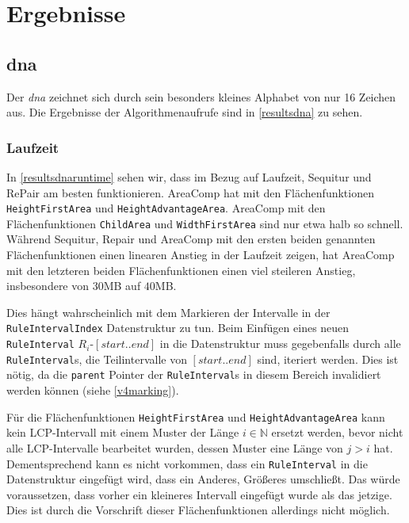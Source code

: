 \section{Ergebnisse}

\subsection{dna}

Der \emph{dna} zeichnet sich durch sein besonders kleines Alphabet von nur 16 Zeichen aus. Die Ergebnisse der Algorithmenaufrufe sind in \autoref{resultsdna} zu sehen. 

\subsubsection{Laufzeit}

In \autoref{resultsdnaruntime} sehen wir, dass im Bezug auf Laufzeit, Sequitur und RePair am besten funktionieren. AreaComp hat mit den Flächenfunktionen \texttt{HeightFirstArea} und \texttt{HeightAdvantageArea}. AreaComp mit den Flächenfunktionen \texttt{ChildArea} und \texttt{WidthFirstArea} sind nur etwa halb so schnell. 
Während Sequitur, Repair und AreaComp mit den ersten beiden genannten Flächenfunktionen einen linearen Anstieg in der Laufzeit zeigen, hat AreaComp mit den letzteren beiden Flächenfunktionen einen viel steileren Anstieg, insbesondere von $30$MB auf $40$MB.

Dies hängt wahrscheinlich mit dem Markieren der Intervalle in der \texttt{RuleIntervalIndex} Datenstruktur zu tun. Beim Einfügen eines neuen \texttt{RuleInterval} $R_i$-$[start..end]$ in die Datenstruktur muss gegebenfalls durch alle \texttt{RuleInterval}s, die Teilintervalle von $[start..end]$ sind, iteriert werden. Dies ist nötig, da die \texttt{parent} Pointer der \texttt{RuleInterval}s in diesem Bereich invalidiert werden können (siehe \autoref{v4marking}).

Für die Flächenfunktionen \texttt{HeightFirstArea} und \texttt{HeightAdvantageArea} kann kein LCP-Intervall mit einem Muster der Länge $i \in \mathbb{N}$ ersetzt werden, bevor nicht alle LCP-Intervalle bearbeitet wurden, dessen Muster eine Länge von $j > i$ hat.
Dementsprechend kann es nicht vorkommen, dass ein \texttt{RuleInterval} in die Datenstruktur eingefügt wird, dass ein Anderes, Größeres umschließt. Das würde voraussetzen, dass vorher ein kleineres Intervall eingefügt wurde als das jetzige. Dies ist durch die Vorschrift dieser Flächenfunktionen allerdings nicht möglich.

